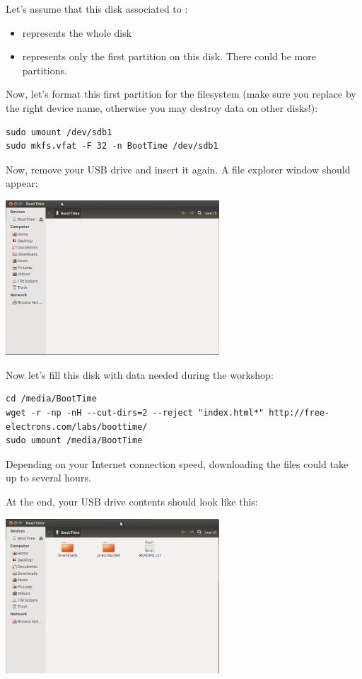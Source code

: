 Let's assume that this disk associated to :
\begin{itemize}
\item {} represents the whole disk
\item {} represents only the first partition on this disk.
      There could be more partitions.
\end{itemize}

Now, let's format this first partition for the  filesystem
(make sure you replace  by the right device name, otherwise
you may destroy data on other disks!):

\begin{verbatim}
sudo umount /dev/sdb1
sudo mkfs.vfat -F 32 -n BootTime /dev/sdb1
\end{verbatim}

Now, remove your USB drive and insert it again. A file explorer window
should appear:
\begin{center}
\includegraphics[width=8cm]{labs/boottime-install/usbdisk-formated.png}
\end{center}

Now let's fill this disk with data needed during the workshop:
{\small
\begin{verbatim}
cd /media/BootTime
wget -r -np -nH --cut-dirs=2 --reject "index.html*" http://free-electrons.com/labs/boottime/
sudo umount /media/BootTime
\end{verbatim}
}

Depending on your Internet connection speed, downloading the files could
take up to several hours.

At the end, your USB drive contents should look like this:
\begin{center}
\includegraphics[width=8cm]{labs/boottime-install/usbdisk-filled.png}
\end{center}

